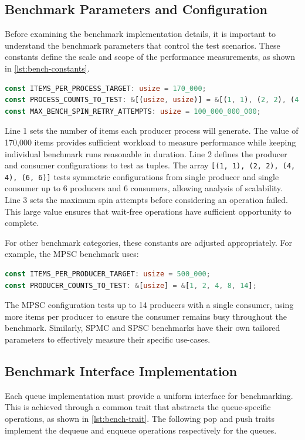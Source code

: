 \subsection{Benchmark Parameters and Configuration}
Before examining the benchmark implementation details, it is important to understand the benchmark parameters that control the test scenarios. These constants define the scale and scope of the performance measurements, as shown in \cref{lst:bench-constants}.

\begin{lstlisting}[language=Rust, style=boxed, caption={Benchmark configuration constants}, label={lst:bench-constants}]
const ITEMS_PER_PROCESS_TARGET: usize = 170_000;
const PROCESS_COUNTS_TO_TEST: &[(usize, usize)] = &[(1, 1), (2, 2), (4, 4), (6, 6)];
const MAX_BENCH_SPIN_RETRY_ATTEMPTS: usize = 100_000_000_000;
\end{lstlisting}

Line 1 sets the number of items each producer process will generate. The value of 170,000 items provides sufficient workload to measure performance while keeping individual benchmark runs reasonable in duration. Line 2 defines the producer and consumer configurations to test as tuples. The array \texttt{[(1, 1), (2, 2), (4, 4), (6, 6)]} tests symmetric configurations from single producer and single consumer up to 6 producers and 6 consumers, allowing analysis of scalability. Line 3 sets the maximum spin attempts before considering an operation failed. This large value ensures that wait-free operations have sufficient opportunity to complete.

For other benchmark categories, these constants are adjusted appropriately. For example, the \ac{MPSC} benchmark uses:

\begin{lstlisting}[language=Rust, style=boxed, caption={MPSC-specific configuration}, label={lst:mpsc-constants}]
const ITEMS_PER_PRODUCER_TARGET: usize = 500_000;
const PRODUCER_COUNTS_TO_TEST: &[usize] = &[1, 2, 4, 8, 14];
\end{lstlisting}

The \ac{MPSC} configuration tests up to 14 producers with a single consumer, using more items per producer to ensure the consumer remains busy throughout the benchmark. Similarly, \ac{SPMC} and \ac{SPSC} benchmarks have their own tailored parameters to effectively measure their specific use-cases.

\subsection{Benchmark Interface Implementation}
Each queue implementation must provide a uniform interface for benchmarking. This is achieved through a common trait that abstracts the queue-specific operations, as shown in \cref{lst:bench-trait}. The following pop and push traits implement the dequeue and enqueue operations respectively for the queues.


